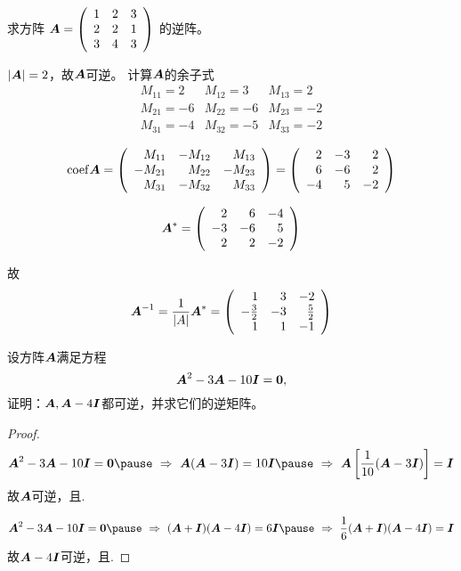 \begin{frame}
\begin{li}
  求方阵
  $
  \boldsymbol{A} = \left(
    \begin{array}{ccc}
      1 & 2 & 3\\
      2 & 2 & 1\\
      3 & 4 & 3
    \end{array}
  \right)
  $
  的逆阵。
\end{li}
\begin{jie}
$|\boldsymbol{A}| = 2$，故$\boldsymbol{A}$可逆。 计算$\boldsymbol{A}$的余子式
$$
\begin{array}{lll}
  M_{11}=2 & M_{12}=3 & M_{13}=2\\
  M_{21}=-6 & M_{22}=-6 & M_{23}=-2\\
  M_{31}=-4 & M_{32}=-5 & M_{33}=-2
\end{array}
$$ \pause 

$$
\mathrm{coef} \boldsymbol{A} = \left(
  \begin{array}{rrr}
    M_{11} & -M_{12} &  M_{13}\\
    -M_{21} &  M_{22} & -M_{23}\\
    M_{31} & -M_{32} &  M_{33}
  \end{array}
\right)  = \left(
  \begin{array}{rrr}
    2 & -3 &  2\\
    6 & -6 &  2 \\
    -4 & 5 & -2
  \end{array}
\right)
$$ \pause 

$$
\boldsymbol{A}^* =  \left(
  \begin{array}{rrr}
    2 & 6 &  -4\\
    -3 & -6 & 5 \\
    2 & 2 & -2
  \end{array}
\right)
$$\pause 

故
$$
\boldsymbol{A}^{-1} = \frac1{|A|}\boldsymbol{A}^* = \left(
  \begin{array}{rrr}
    1 & 3 &  -2\\
    -\frac32 & -3 & \frac52 \\
    1 & 1 & -1
  \end{array}
\right)
$$
\end{jie}
\end{frame}

\begin{frame}
\begin{li}
  设方阵$\boldsymbol{A}$满足方程
  $$
  \MA^2 - 3\MA - 10 \MI = \M0,
  $$
  证明：$\boldsymbol{A}, \boldsymbol{A}-4\boldsymbol{I}$都可逆，并求它们的逆矩阵。      
\end{li} \pause 
\begin{proof}
$$
\MA^2-3\MA-10\MI=\M0 \pause ~\Rightarrow~ \MA(\MA-3\MI) = 10\MI 
\pause ~\Rightarrow~ \MA\left[\frac1{10}(\MA-3\MI)\right] = \MI
$$  \pause 
故$\boldsymbol{A}$可逆，且. \pause 

$$
\MA^2-3\MA-10\MI=\M0 \pause ~\Rightarrow~ (\MA+\MI)(\MA-4\MI) = 6\MI 
\pause ~\Rightarrow~ \frac1{6}(\MA+\MI)(\MA-4\MI) = \MI
$$  \pause 
故$\boldsymbol{A}-4\boldsymbol{I}$可逆，且.

\end{proof}
\end{frame}

